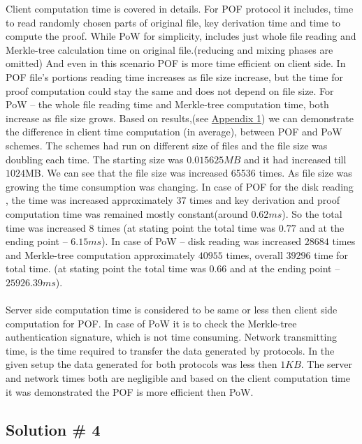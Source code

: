 \documentclass[12pt]{article}
\begin{document}
Client computation time is covered in details. For POF protocol it includes, time to read randomly chosen parts of original file, key derivation time and time to compute the proof. While PoW for simplicity, includes just whole file reading and Merkle-tree calculation time on original file.(reducing and mixing phases are omitted) And even in this scenario POF is more time efficient on client side. In POF file's portions reading time increases as file size increase, but the time for proof computation could stay the same and does not depend on file size. For PoW -- the whole file reading time and Merkle-tree computation time, both increase as file size grows. Based on results,(see \hyperref[Appendix 1] {Appendix 1})  we can demonstrate  the difference in client time computation (in average), between POF and PoW schemes. The schemes had run on different size of files and the file size was doubling each time. The starting size was $0.015625MB$ and it had increased till $1024$MB. We can see that the file size was increased 65536 times. As file size was growing the time consumption was changing. In case of POF  for the disk reading , the time was increased approximately $37$ times and key derivation and  proof computation time was remained mostly constant(around $0.62 ms$). So the total time was increased $8$ times (at stating point the total time was $0.77$ and at the ending point -- $6.15 ms$). In case of PoW -- disk reading was increased $28684$ times and Merkle-tree computation approximately $40955$ times, overall $39296$ time for total time. (at stating point the total time was $0.66$ and at the ending point -- $25926.39 ms$). \\\\
Server side computation time is considered to be same or less then client side computation for POF. In case of PoW it is to check the Merkle-tree authentication signature, which is not time consuming. Network transmitting time, is the time required to transfer the data generated by protocols. In the given setup the data generated for both protocols was less then $1KB$. The server and network times both are negligible and based on the client computation time it was demonstrated the POF is more efficient then PoW.

\subsection{Solution \# 4}
\label{sub:Soltuion4}
\end{document}
